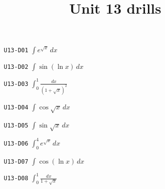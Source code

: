 
\title{Unit 13 drills}

\maketitle
\begin{enumerate}
  \item[\texttt{U13-D01}] $\displaystyle\int e^{\sqrt{x}}\,dx$
  \item[\texttt{U13-D02}] $\displaystyle\int\sin(\ln x)\,dx$
  \item[\texttt{U13-D03}] $\displaystyle\int_{0}^{1}\frac{dx}{(1+\sqrt{x})^{2}}$
  \item[\texttt{U13-D04}] $\displaystyle\int\cos\sqrt{x}\,dx$
  \item[\texttt{U13-D05}] $\displaystyle\int\sin\sqrt{x}\,dx$
  \item[\texttt{U13-D06}] $\displaystyle\int_{0}^{4}e^{\sqrt{x}}\,dx$
  \item[\texttt{U13-D07}] $\displaystyle\int\cos(\ln x)\,dx$
  \item[\texttt{U13-D08}] $\displaystyle\int_{0}^{1}\frac{dx}{1+\sqrt{x}}$
\end{enumerate}

